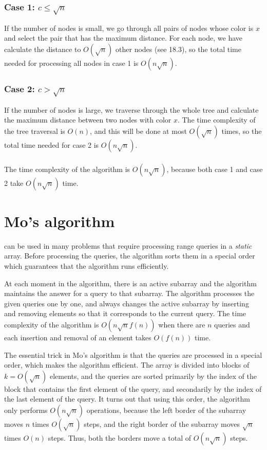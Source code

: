 \subsubsection*{Case 1: $c \le \sqrt n$}

If the number of nodes is small,
we go through all pairs of nodes whose
color is $x$ and select the pair that
has the maximum distance.
For each node, we have calculate the distance
to $O(\sqrt n)$ other nodes (see 18.3),
so the total time needed for processing all
nodes in case 1 is $O(n \sqrt n)$.

\subsubsection*{Case 2: $c > \sqrt n$}

If the number of nodes is large,
we traverse through the whole tree
and calculate the maximum distance between
two nodes with color $x$.
The time complexity of the tree traversal is $O(n)$,
and this will be done at most $O(\sqrt n)$ times,
so the total time needed for case 2 is
$O(n \sqrt n)$.\\\\
\noindent
The time complexity of the algorithm is $O(n \sqrt n)$,
because both case 1 and case 2 take $O(n \sqrt n)$ time.

\section{Mo's algorithm}


 can be used in many problems
that require processing range queries in 
a \emph{static} array.
Before processing the queries, the algorithm
sorts them in a special order which guarantees
that the algorithm runs efficiently.

At each moment in the algorithm, there is an active
subarray and the algorithm maintains the answer
for a query to that subarray.
The algorithm processes the given queries one by one,
and always changes the active subarray
by inserting and removing elements
so that it corresponds to the current query.
The time complexity of the algorithm is
$O(n \sqrt n f(n))$ when there are $n$ queries
and each insertion and removal of an element
takes $O(f(n))$ time.

The essential trick in Mo's algorithm is that
the queries are processed in a special order,
which makes the algorithm efficient.
The array is divided into blocks of $k=O(\sqrt n)$
elements, and the queries are sorted primarily by
the index of the block that contains the first element
of the query, and secondarily by the index of the
last element of the query.
It turns out that using this order, the algorithm
only performs $O(n \sqrt n)$ operations,
because the left border of the subarray moves
$n$ times $O(\sqrt n)$ steps,
and the right border of the subarray moves
$\sqrt n$ times $O(n)$ steps. Thus, both the
borders move a total of $O(n \sqrt n)$ steps.

